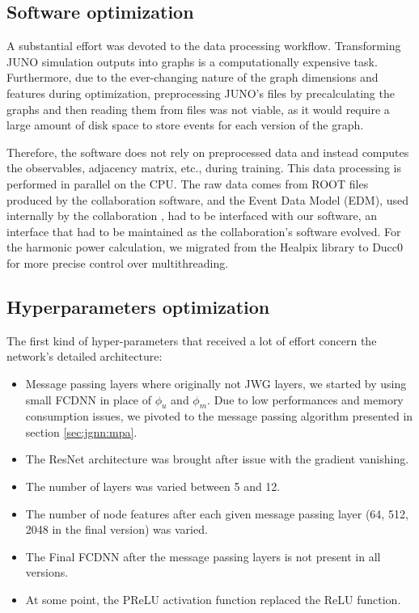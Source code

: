 \documentclass[../main.tex]{subfiles}
\begin{document}
\subsection{Software optimization}


A substantial effort was devoted to the data processing workflow. Transforming JUNO simulation outputs into graphs is a computationally expensive task. Furthermore, due to the ever-changing nature of the graph dimensions and features during optimization, preprocessing JUNO's files by precalculating the graphs and then reading them from files was not viable, as it would require a large amount of disk space to store events for each version of the graph.

Therefore, the software does not rely on preprocessed data and instead computes the observables, adjacency matrix, etc., during training. This data processing is performed in parallel on the CPU. The raw data comes from ROOT files produced by the collaboration software, and the Event Data Model (EDM), used internally by the collaboration \cite{li_design_2017}, had to be interfaced with our software, an interface that had to be maintained as the collaboration's software evolved. For the harmonic power calculation, we migrated from the Healpix library to Ducc0 \cite{reinecke_ducc0_2024} for more precise control over multithreading.

\subsection{Hyperparameters optimization}

The first kind of hyper-parameters that received a lot of effort concern the network's detailed architecture:
\begin{itemize}
  \item Message passing layers where originally not JWG layers, we started by using small FCDNN in place of $\phi_u$ and $\phi_m$. Due to low performances and memory consumption issues, we pivoted to the message passing algorithm presented in section \ref{sec:jgnn:mpa}.

  \item The ResNet architecture was brought after issue with the gradient vanishing.

  \item The number of layers was varied between 5 and 12.

  \item The number of node features after each given message passing layer (64, 512, 2048 in the final version) was varied.

  \item The Final FCDNN after the message passing layers is not present in all versions.

  \item At some point, the PReLU activation function replaced the ReLU function.
\end{itemize}
\end{document}
